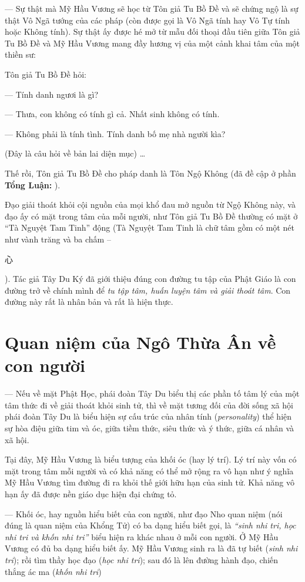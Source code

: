 — Sự thật mà Mỹ Hầu Vương sẽ học từ Tôn giả Tu Bồ Đề và sẽ chứng ngộ là sự thật Vô Ngã tướng của các pháp (còn được gọi là Vô Ngã tính hay Vô Tự tính hoặc Không tính). Sự thật ấy được hé mở từ mẫu đối thoại đầu tiên giữa Tôn giả Tu Bồ Đề và Mỹ Hầu Vương mang đầy hương vị của một cảnh khai tâm của một thiền sư:

Tôn giả Tu Bồ Đề hỏi:

— Tính danh ngươi là gì?

— Thưa, con không có tính gì cả. Nhất sinh không có tính.

— Không phải là tính tình. Tính danh bố mẹ nhà người kìa?

(Đây là câu hỏi về bản lai diện mục) \ldots

Thế rồi, Tôn giả Tu Bồ Đề cho pháp danh là Tôn Ngộ Không (đã đề cập ở phần {\bf Tổng Luận:} ).

Đạo giải thoát khỏi cội nguồn của mọi khổ đau mở nguồn từ Ngộ Không này, và đạo ấy có mặt trong tâm của mỗi người, như Tôn giả Tu Bồ Đề thường có mặt ở ``Tà Nguyệt Tam Tinh'' động (Tà Nguyệt Tam Tinh là chữ tâm gồm có một nét như vành trăng và ba chấm -- \begin{CJK*}{UTF8}{bkai}心\end{CJK*}). Tác giả Tây Du Ký đã giới thiệu đúng con đường tu tập của Phật Giáo là con đường trở về chính mình để \emph{tu tập tâm, huấn luyện tâm và giải thoát tâm}. Con đường này rất là nhân bản và rất là hiện thực.

\section{Quan niệm của Ngô Thừa Ân về con người} %
\label{sec:1_quan_niem_ve_con_nguoi}

— Nếu về mặt Phật Học, phái đoàn Tây Du biểu thị các phần tố tâm lý của một tâm thức đi về giải thoát khỏi sinh tử, thì về mặt tương đối của đời sống xã hội phái đoàn Tây Du là biểu hiện sự cấu trúc của nhân tính (\emph{personality}) thể hiện sự hòa điệu giữa tim và óc, giữa tiềm thức, siêu thức và ý thức, giữa cá nhân và xã hội.

Tại đây, Mỹ Hầu Vương là biểu tượng của khối óc (hay lý trí). Lý trí này vốn có mặt trong tâm mỗi người và có khả năng có thể mở rộng ra vô hạn như ý nghĩa Mỹ Hầu Vương tìm đường đi ra khỏi thế giới hữu hạn của sinh tử. Khả năng vô hạn ấy đã được nền giáo dục hiện đại chứng tỏ.

— Khối óc, hay nguồn hiểu biết của con người, như đạo Nho quan niệm (nói đúng là quan niệm của Khổng Tử) có ba dạng hiểu biết gọi, là \emph{``sinh nhi tri, học nhi tri và khốn nhi tri''} biểu hiện ra khác nhau ở mỗi con người. Ở Mỹ Hầu Vương có đủ ba dạng hiểu biết ấy. Mỹ Hầu Vương sinh ra là đã tự biết (\emph{sinh nhi tri}); rồi tìm thầy học đạo (\emph{học nhi tri}); sau đó là lên đường hành đạo, chiến thắng ác ma (\emph{khốn nhi tri})

